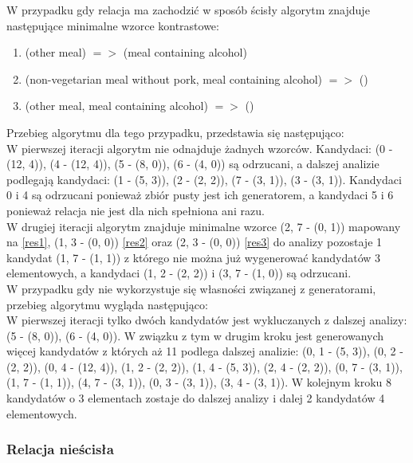 \documentclass[a4paper,12pt]{article}
\begin{document}
W przypadku gdy relacja ma zachodzić w sposób ścisły algorytm znajduje następujące minimalne wzorce kontrastowe:

\begin{enumerate}
\item (other meal) $=>$ (meal containing alcohol) \label{res1}
\item (non-vegetarian meal without pork, meal containing alcohol) $=>$ () \label{res2}
\item (other meal, meal containing alcohol) $=>$ () \label{res3}
\end{enumerate}

Przebieg algorytmu dla tego przypadku, przedstawia się następująco:\\

W pierwszej iteracji algorytm nie odnajduje żadnych wzorców. Kandydaci: (0 - (12, 4)), (4 - (12, 4)), (5 - (8, 0)), (6 - (4, 0)) są odrzucani,
a dalszej analizie podlegają kandydaci: (1 - (5, 3)), (2 - (2, 2)), (7 - (3, 1)), (3 - (3, 1)). Kandydaci 0 i 4 są odrzucani ponieważ zbiór pusty jest ich generatorem, a kandydaci 5 i 6 ponieważ relacja nie jest dla nich spełniona ani razu.\\

W drugiej iteracji algorytm znajduje minimalne wzorce (2, 7 - (0, 1)) mapowany na \ref{res1}, (1, 3 - (0, 0)) \ref{res2} oraz (2, 3 - (0, 0)) \ref{res3} do analizy pozostaje 1 kandydat (1, 7 - (1, 1)) z którego nie można już wygenerować kandydatów 3 elementowych, a kandydaci (1, 2 - (2, 2)) i (3, 7 - (1, 0)) są odrzucani.\\

W przypadku gdy nie wykorzystuje się własności związanej z generatorami, przebieg algorytmu wygląda następująco:\\

W pierwszej iteracji tylko dwóch kandydatów jest wykluczanych z dalszej analizy: (5 - (8, 0)), (6 - (4, 0)). W związku z tym w drugim kroku jest generowanych więcej kandydatów z których aż 11 podlega dalszej analizie: (0, 1 - (5, 3)), (0, 2 - (2, 2)), (0, 4 - (12, 4)), (1, 2 - (2, 2)), (1, 4 - (5, 3)), (2, 4 - (2, 2)), (0, 7 - (3, 1)), (1, 7 - (1, 1)), (4, 7 - (3, 1)), (0, 3 - (3, 1)), (3, 4 - (3, 1)). W kolejnym kroku 8 kandydatów o 3 elementach zostaje do dalszej analizy i dalej 2 kandydatów 4 elementowych.

\subsubsection{Relacja nieścisła}
\end{document}
